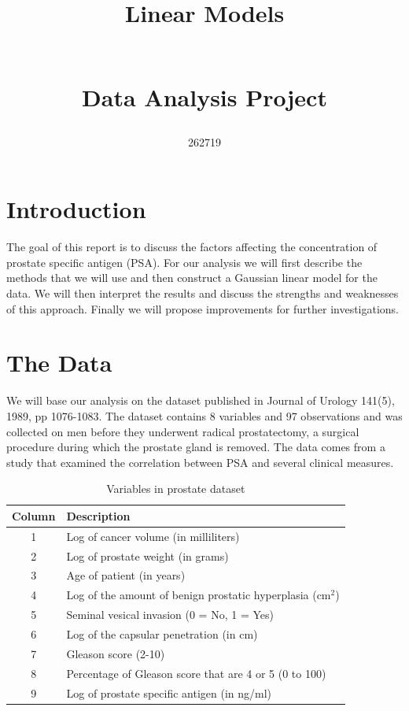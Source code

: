 \documentclass[10pt]{article}
\author{262719}
\title{\begin{huge}
Linear Models
\end{huge}\\Data Analysis Project}
\date{}
\begin{document}
\maketitle
 
\tableofcontents
\newpage

\section{Introduction}
\quad The goal of this report is to discuss the factors affecting the concentration of prostate specific antigen (PSA). For our analysis we will first describe the methods that we will use and then construct a Gaussian linear model for the data. We will then interpret the results and discuss the strengths and weaknesses of this approach. Finally we will propose improvements for further investigations.

\section{The Data}
\quad We will base our analysis on the dataset published in Journal of Urology 141(5), 1989, pp 1076-1083. The dataset contains 8 variables and 97 observations and was collected on men before they underwent radical prostatectomy, a surgical procedure during which the prostate gland is removed. The data comes from a study that examined the correlation between PSA and several clinical measures. 

\begin{table}[ht]
\centering
\caption{Variables in prostate dataset} \label{datadescript}
\begin{tabular}{cl}
  \hline
 Column & Description \\ 
  \hline
1 & Log of cancer volume (in milliliters) \\
2 & Log of prostate weight (in grams)  \\
3 & Age of patient (in years)  \\
4 & Log of the amount of benign prostatic hyperplasia (cm${^2}$) \\
5 & Seminal vesical invasion (0 = No, 1 = Yes)  \\
6 & Log of the capsular penetration (in cm)  \\
7 & Gleason score (2-10)  \\
8 & Percentage of Gleason score that are 4 or 5 (0 to 100) \\ 
9 & Log of prostate specific antigen (in ng/ml) \\
   \hline
\end{tabular}
\end{table}
\end{document}
